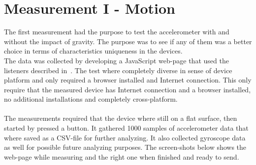 \section{Measurement I - Motion}\label{sec:measurementI}
The first measurement had the purpose to test the accelerometer with and without the impact of gravity. The purpose was to see if any of them was a better choice in terms of characteristics uniqueness in the devices.\\
The data was collected by developing a JavaScript web-page that used the listeners described in~. The test where completely diverse in sense of device platform and only required a browser installed and Internet connection. 
This only require that the measured device has Internet connection and a browser installed, no additional installations and completely cross-platform.\\
\\
The measurements required that the device where still on a flat surface, then started by pressed a button. It gathered 1000 samples of accelerometer data that where saved as a CSV-file for further analyzing. It also collected gyroscope data as well for possible future analyzing purposes. The screen-shots below shows the web-page while measuring and the right one when finished and ready to send. 

